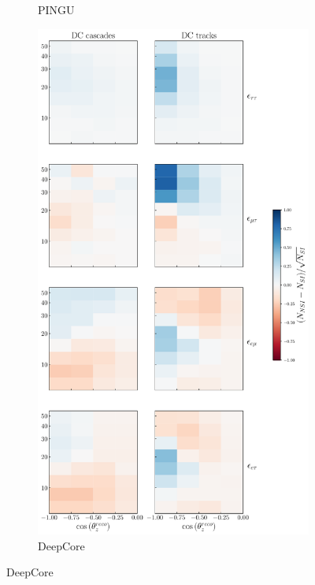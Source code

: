 {{\begin{figure}[t]
\begin{center}
\begin{subfigure}{0.38\textwidth}
         \caption{PINGU}\label{fig:PINGU_event_pulls}
      \end{subfigure}
      \begin{subfigure}{0.4\textwidth}
         \includegraphics[width=1\linewidth]{figures/DC_event_pulls.pdf}
         \caption{DeepCore}\label{fig:DC_event_pulls}
      \end{subfigure}
    \end{center}

\end{figure}}}
